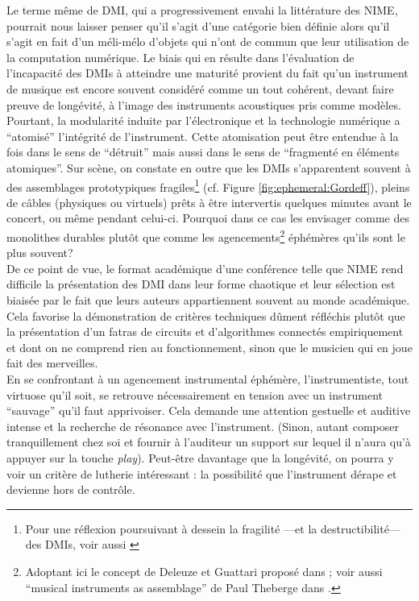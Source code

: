 \noindent Le terme même de \gls{DMI}, qui a progressivement envahi la littérature des \gls{NIME}, pourrait nous laisser penser qu'il s'agit d'une catégorie bien définie alors qu'il s'agit en fait d'un méli-mélo d'objets qui n'ont de commun que leur utilisation de la computation numérique. Le biais qui en résulte dans l'évaluation de l'incapacité des \glspl{DMI} à atteindre une maturité provient du fait qu'un instrument de musique est encore souvent considéré comme un tout cohérent, devant faire preuve de longévité, à l’image des instruments acoustiques pris comme modèles.\\
\indent Pourtant, la modularité induite par l'électronique et la technologie numérique a ``atomisé'' l'intégrité de l'instrument. Cette atomisation peut être entendue à la fois dans le sens de ``détruit'' mais aussi dans le sens de ``fragmenté en éléments atomiques''. Sur scène, on constate en outre que les \glspl{DMI} s'apparentent souvent à des assemblages prototypiques fragiles\footnote{Pour une réflexion poursuivant à dessein la fragilité —et la destructibilité— des \glspl{DMI}, voir aussi \cite{haddad_fragile_2017}} (cf. Figure \ref{fig:ephemeral:Gordeff}), pleins de câbles (physiques ou virtuels) prêts à être intervertis quelques minutes avant le concert, ou même pendant celui-ci. Pourquoi dans ce cas les envisager comme des monolithes durables plutôt que comme les agencements\footnote{Adoptant ici le concept de Deleuze et Guattari proposé dans \cite{deleuze_mille_1980}; voir aussi ``musical instruments as assemblage'' de Paul Theberge dans \cite{bovermann_musical_2017}.} éphémères qu’ils sont le plus souvent?\\
\indent De ce point de vue, le format académique d'une conférence telle que \gls{NIME} rend difficile la présentation des \gls{DMI} dans leur forme chaotique et leur sélection est biaisée par le fait que leurs auteurs appartiennent souvent au monde académique. Cela favorise la démonstration de critères techniques dûment réfléchis plutôt que la présentation d'un fatras de circuits et d'algorithmes connectés empiriquement et dont on ne comprend rien au fonctionnement, sinon que le musicien qui en joue fait des merveilles.\\
\indent En se confrontant à un agencement instrumental éphémère, l'instrumentiste, tout virtuose qu'il soit, se retrouve nécessairement en tension avec un instrument ``sauvage'' qu'il faut apprivoiser. Cela demande une attention gestuelle et auditive intense et la recherche de résonance avec l'instrument. (Sinon, autant composer tranquillement chez soi et fournir à l’auditeur un support sur lequel il n’aura qu’à appuyer sur la touche \textit{play}). Peut-être davantage que la longévité, on pourra y voir un critère de lutherie intéressant : la possibilité que l'instrument dérape et devienne hors de contrôle.

